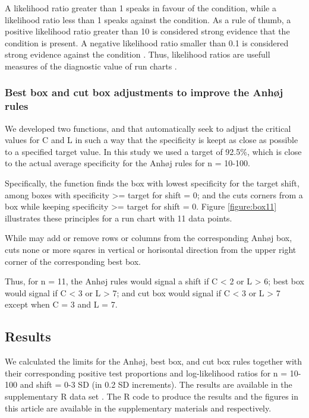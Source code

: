 A likelihood ratio greater than 1 speaks in favour of the condition,
while a likelihood ratio less than 1 speaks against the condition. As a
rule of thumb, a positive likelihood ratio greater than 10 is considered
strong evidence that the condition is present. A negative likelihood
ratio smaller than 0.1 is considered strong evidence against the
condition \citep{deeks2004}. Thus, likelihood ratios are usefull
measures of the diagnostic value of run charts
\citep{anhoej2015, anhoej2018}.

\hypertarget{best-box-and-cut-box-adjustments-to-improve-the-anhj-rules}{%
\subsubsection{Best box and cut box adjustments to improve the Anhøj
rules}\label{best-box-and-cut-box-adjustments-to-improve-the-anhj-rules}}

We developed two functions,  and  that
automatically seek to adjust the critical values for C and L in such a
way that the specificity is keept as close as possible to a specified
target value. In this study we used a target of 92.5\%, which is close
to the actual average specificity for the Anhøj rules for n = 10-100.

Specifically, the  function finds the box with lowest
specificity for the target shift, among boxes with specificity
\textgreater{}= target for shift = 0; and the  cuts
corners from a box while keeping specificity \textgreater{}= target for
shift = 0. Figure \ref{figure:box11} illustrates these principles for a
run chart with 11 data points.

While  may add or remove rows or columns from the
corresponding Anhøj box,  cuts none or more sqares in
vertical or horisontal direction from the upper right corner of the
corresponding best box.

Thus, for n = 11, the Anhøj rules would signal a shift if C \textless{}
2 or L \textgreater{} 6; best box would signal if C \textless{} 3 or L
\textgreater{} 7; and cut box would signal if C \textless{} 3 or L
\textgreater{} 7 except when C = 3 and L = 7.

\hypertarget{results}{%
\subsection{Results}\label{results}}

We calculated the limits for the Anhøj, best box, and cut box rules
together with their corresponding positive test proportions and
log-likelihood ratios for n = 10-100 and shift = 0-3 SD (in 0.2 SD
increments). The results are available in the supplementary R data set
. The R code to produce the results and the figures
in this article are available in the supplementary materials
 and  respectively.

